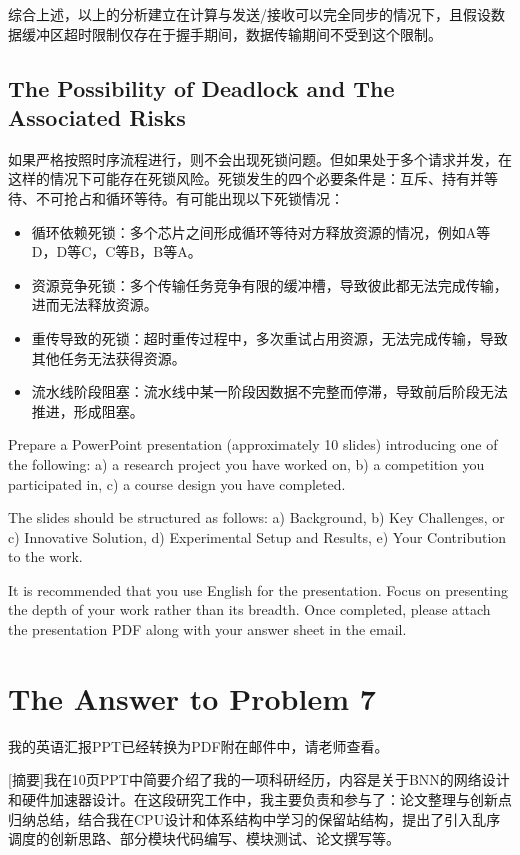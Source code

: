 \documentclass[11pt, a4 paper]{article}
\begin{document}
综合上述，以上的分析建立在计算与发送/接收可以完全同步的情况下，且假设数据缓冲区超时限制仅存在于握手期间，数据传输期间不受到这个限制。

\subsection{The Possibility of Deadlock and The Associated Risks}
如果严格按照时序流程进行，则不会出现死锁问题。但如果处于多个请求并发，在这样的情况下可能存在死锁风险。死锁发生的四个必要条件是：互斥、持有并等待、不可抢占和循环等待。有可能出现以下死锁情况：
\begin{itemize}
    \item 循环依赖死锁：多个芯片之间形成循环等待对方释放资源的情况，例如A等D，D等C，C等B，B等A。
    \item 资源竞争死锁：多个传输任务竞争有限的缓冲槽，导致彼此都无法完成传输，进而无法释放资源。
    \item 重传导致的死锁：超时重传过程中，多次重试占用资源，无法完成传输，导致其他任务无法获得资源。
    \item 流水线阶段阻塞：流水线中某一阶段因数据不完整而停滞，导致前后阶段无法推进，形成阻塞。
\end{itemize}

Prepare a PowerPoint presentation (approximately 10 slides) introducing one of the following: a) a research project you have worked on, b) a competition you participated in, c) a course design you have completed. 

The slides should be structured as follows: a) Background, b) Key Challenges, or c) Innovative Solution, d) Experimental Setup and Results, e) Your Contribution to the work. 

It is recommended that you use English for the presentation. Focus on presenting the depth of your work rather than its breadth. Once completed, please attach the presentation PDF along with your answer sheet in the email.

\section{The Answer to Problem 7}
我的英语汇报PPT已经转换为PDF附在邮件中，请老师查看。

[摘要]我在10页PPT中简要介绍了我的一项科研经历，内容是关于BNN的网络设计和硬件加速器设计。在这段研究工作中，我主要负责和参与了：论文整理与创新点归纳总结，结合我在CPU设计和体系结构中学习的保留站结构，提出了引入乱序调度的创新思路、部分模块代码编写、模块测试、论文撰写等。
\end{document}
